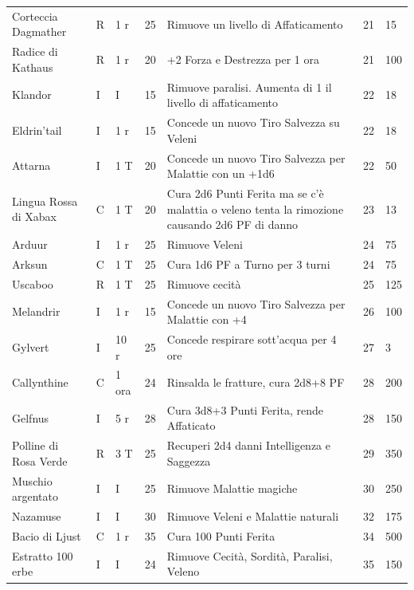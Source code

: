 \begin{xltabular}{\linewidth}{llllXll}
	Corteccia Dagmather & R& 1 r & 25& Rimuove un livello di Affaticamento& 21 & 15 \\

	Radice di Kathaus & R& 1 r& 20& +2 Forza e Destrezza per 1 ora & 21 & 100 \\

	Klandor & I& I& 15& Rimuove paralisi. Aumenta di 1 il livello di affaticamento& 22 & 18 \\

	Eldrin'tail & I& 1 r& 15& Concede un nuovo Tiro Salvezza su Veleni& 22 & 18 \\

	Attarna & I& 1 T & 20& Concede un nuovo Tiro Salvezza per Malattie con un +1d6& 22 & 50 \\

	Lingua Rossa di Xabax & C& 1 T & 20& Cura 2d6 Punti Ferita ma se c'è malattia o veleno tenta la rimozione causando 2d6 PF di danno & 23 & 13 \\

	Arduur & I& 1 r & 25& Rimuove Veleni& 24 & 75 \\

	Arksun & C& 1 T& 25& Cura 1d6 PF a Turno per 3 turni& 24 & 75 \\

	Uscaboo & R& 1 T & 25& Rimuove cecità& 25 & 125 \\

	Melandrir & I& 1 r & 15& Concede un nuovo Tiro Salvezza per Malattie con +4& 26 & 100 \\

	Gylvert & I& 10 r& 25& Concede respirare sott'acqua per 4 ore & 27 & 3 \\

	Callynthine & C& 1 ora& 24& Rinsalda le fratture, cura 2d8+8 PF & 28 & 200\\

	Gelfnus & I& 5 r & 28& Cura 3d8+3 Punti Ferita, rende Affaticato & 28 & 150 \\

	Polline di Rosa Verde & R& 3 T & 25& Recuperi 2d4 danni Intelligenza e Saggezza& 29 & 350 \\

	Muschio argentato & I& I& 25& Rimuove Malattie magiche & 30 & 250\\

	Nazamuse & I& I& 30& Rimuove Veleni e Malattie naturali & 32 & 175\\

	Bacio di Ljust & C& 1 r & 35& Cura 100 Punti Ferita& 34 & 500\\

	Estratto 100 erbe & I& I& 24& Rimuove Cecità, Sordità, Paralisi, Veleno &35&150 \\
\end{xltabular}

